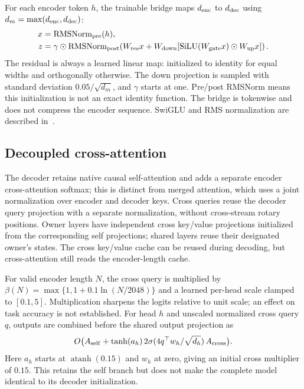 \documentclass[10pt,twocolumn]{article}
\begin{document}
For each encoder token $h$, the trainable bridge maps $d_{\rm enc}$ to $d_{\rm dec}$ using $d_m=\max(d_{\rm enc},d_{\rm dec})$:
\begin{align}
 x&=\operatorname{RMSNorm}_{\rm pre}(h),\\
 z&=\gamma\odot\operatorname{RMSNorm}_{\rm post}\!\left(W_{\rm res}x+W_{\rm down}[\operatorname{SiLU}(W_{\rm gate}x)\odot W_{\rm up}x]\right).
\end{align}
The residual is always a learned linear map: initialized to identity for equal widths and orthogonally otherwise. The down projection is sampled with standard deviation $0.05/\sqrt{d_m}$, and $\gamma$ starts at one. Pre/post RMSNorm means this initialization is not an exact identity function. The bridge is tokenwise and does not compress the encoder sequence. SwiGLU and RMS normalization are described in~\cite{swiglu_2020,rmsnorm_2019}.
\subsection{Decoupled cross-attention}
The decoder retains native causal self-attention and adds a separate encoder cross-attention softmax; this is distinct from merged attention, which uses a joint normalization over encoder and decoder keys. Cross queries reuse the decoder query projection with a separate normalization, without cross-stream rotary positions. Owner layers have independent cross key/value projections initialized from the corresponding self projections; shared layers reuse their designated owner's states. The cross key/value cache can be reused during decoding, but cross-attention still reads the encoder-length cache.

For valid encoder length $N$, the cross query is multiplied by $\beta(N)=\max\{1,1+0.1\ln(N/2048)\}$ and a learned per-head scale clamped to $[0.1,5]$. Multiplication sharpens the logits relative to unit scale; an effect on task accuracy is not established. For head $h$ and unscaled normalized cross query $q$, outputs are combined before the shared output projection as
\begin{equation}
 O\bigl(A_{\rm self}+\tanh(a_h)\,2\sigma(4q^\top w_h/\sqrt{d_h})\,A_{\rm cross}\bigr).
\end{equation}
Here $a_h$ starts at $\operatorname{atanh}(0.15)$ and $w_h$ at zero, giving an initial cross multiplier of $0.15$. This retains the self branch but does not make the complete model identical to its decoder initialization.
\end{document}
